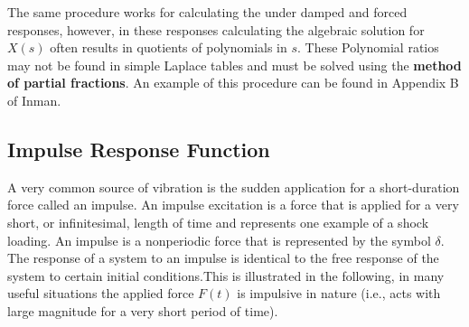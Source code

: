 \documentclass[12pt,a4paper]{article}
\newcommand{\Laplace}[1]{\ensuremath{\mathcal{L}{\left[#1\right]}}}
\begin{document}
The same procedure works for calculating the under damped and forced responses, however, in these responses calculating the algebraic solution for $X(s)$ often results in quotients of polynomials in $s$. These Polynomial ratios may not be found in simple Laplace tables and must be solved using the \textbf{method of partial fractions}. An example of this procedure can be found in Appendix B of Inman. 


\subsection*{Impulse Response Function}
A very common source of vibration is the sudden application for a short-duration force called an impulse. An impulse excitation is a force that is applied for a very short, or infinitesimal, length of time and represents one example of a shock loading. An impulse is a nonperiodic force that is represented by the symbol $\delta$. The response of a system to an impulse is identical to the free response of the system to certain initial conditions.This is illustrated in the following, in many useful situations the applied force $F(t)$ is impulsive in nature
(i.e., acts with large magnitude for a very short period of time).
\end{document}
